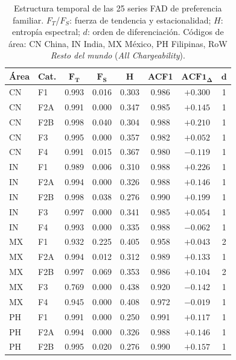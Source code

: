 \documentclass[12pt,letterpaper]{report}
\begin{document}
\begin{table}[H]
\centering
\footnotesize
\caption[Características estructurales de las series]{Estructura temporal de las 25 series FAD de preferencia familiar. $F_T$/$F_S$: fuerza de tendencia y estacionalidad; $H$: entropía espectral; $d$: orden de diferenciación. Códigos de área: CN China, IN India, MX México, PH Filipinas, RoW \textit{Resto del mundo} (\textit{All Chargeability}).}
\label{tab:features_estructura}
\begin{tabular}{llcccccc}
\toprule
\rowcolor{uacjblue!15}
\textbf{Área} & \textbf{Cat.} & $\mathbf{F_T}$ & $\mathbf{F_S}$ & $\mathbf{H}$ & \textbf{ACF1} & $\mathbf{ACF1_\Delta}$ & $\mathbf{d}$ \\ \midrule
CN & F1 & 0.993 & 0.016 & 0.303 & 0.986 & $+0.300$ & 1 \\
CN & F2A & 0.991 & 0.000 & 0.347 & 0.985 & $+0.145$ & 1 \\
CN & F2B & 0.998 & 0.040 & 0.304 & 0.988 & $+0.210$ & 1 \\
CN & F3 & 0.995 & 0.000 & 0.357 & 0.982 & $+0.052$ & 1 \\
CN & F4 & 0.991 & 0.015 & 0.367 & 0.980 & $-0.119$ & 1 \\
IN & F1 & 0.989 & 0.006 & 0.310 & 0.988 & $+0.226$ & 1 \\
IN & F2A & 0.994 & 0.000 & 0.326 & 0.988 & $+0.146$ & 1 \\
IN & F2B & 0.998 & 0.038 & 0.276 & 0.990 & $+0.199$ & 1 \\
IN & F3 & 0.997 & 0.000 & 0.341 & 0.985 & $+0.054$ & 1 \\
IN & F4 & 0.993 & 0.000 & 0.335 & 0.988 & $-0.062$ & 1 \\
MX & F1 & 0.932 & 0.225 & 0.405 & 0.958 & $+0.043$ & 2 \\
MX & F2A & 0.994 & 0.012 & 0.312 & 0.989 & $+0.133$ & 1 \\
MX & F2B & 0.997 & 0.069 & 0.353 & 0.986 & $+0.104$ & 2 \\
MX & F3 & 0.769 & 0.000 & 0.438 & 0.920 & $-0.142$ & 1 \\
MX & F4 & 0.945 & 0.000 & 0.408 & 0.972 & $-0.019$ & 1 \\
PH & F1 & 0.991 & 0.000 & 0.250 & 0.991 & $+0.117$ & 1 \\
PH & F2A & 0.994 & 0.000 & 0.326 & 0.988 & $+0.146$ & 1 \\
PH & F2B & 0.995 & 0.020 & 0.276 & 0.990 & $+0.157$ & 1 \\

\end{tabular}
\end{table}
\end{document}
